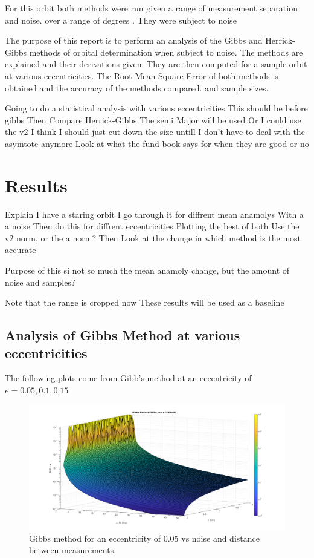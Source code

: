 \documentclass[12pt]{article}
\begin{document}
	
	For this orbit both methods were run given a range of measurement separation and noise.  over a range of degrees . They were subject to noise
	
	The purpose of this report is to perform an analysis of the Gibbs and Herrick-Gibbs methods of orbital determination when subject to noise. The methods are explained and their derivations given. They are then computed for a sample orbit at various eccentricities. The Root Mean Square Error of both methods is obtained and the accuracy of the methods compared.   and sample sizes. 
	
	
	Going to do a statistical analysis with various eccentricities
	This should be before gibbs
	Then Compare Herrick-Gibbs
	The semi Major will be used
	Or I could use the v2
	I think I should just cut down the size untill I don't have to deal with the asymtote anymore
	Look at what the fund book says for when they are good or no
	
	\section{Results}
	Explain I have a staring orbit
	I go through it for diffrent mean anamolys
	With a a noise
	Then do this for diffrent eccentricities
	Plotting the best of both
	Use the v2 norm, or the a norm?
	Then Look at the change in which method is the most accurate
	
	Purpose of this si not so much the mean anamoly change, but the amount of noise and samples?
	\fi
	
	Note that the range is cropped now
	These results will be used as a baseline
	
	\subsection{Analysis of Gibbs Method at various eccentricities}
	The following plots come from Gibb's method at an eccentricity of $e=0.05,0.1,0.15$
	\begin{figure}
		\centering
		\includegraphics[width=0.7\linewidth]{gibbs_e_05}
		\caption{Gibbs method for an eccentricity of 0.05 vs noise and distance between measurements.}
		\label{fig:gibbse05}
	\end{figure}
\end{document}
